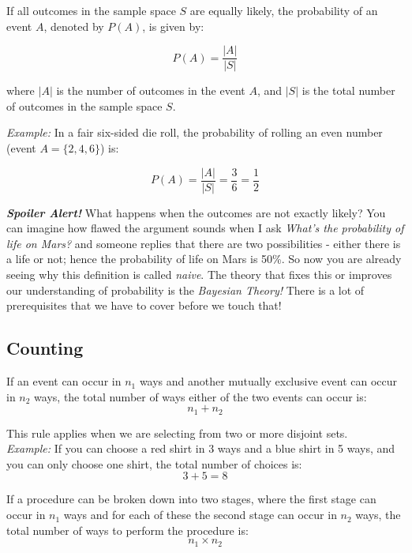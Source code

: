 \begin{definition}
    If all outcomes in the sample space \( S \) are equally likely, the probability of an event \( A \), denoted by \( P(A) \), is given by:

\[
P(A) = \frac{|A|}{|S|}
\]

where \( |A| \) is the number of outcomes in the event \( A \), and \( |S| \) is the total number of outcomes in the sample space \( S \).
\end{definition}

\textit{Example:} In a fair six-sided die roll, the probability of rolling an even number (event \( A = \{2, 4, 6\} \)) is:

\[
P(A) = \frac{|A|}{|S|} = \frac{3}{6} = \frac{1}{2}
\]

\textit{\textbf{Spoiler Alert!}} What happens when the outcomes are not exactly likely? You can imagine how flawed the argument sounds when I ask \textit{What's the probability of life on Mars?} and someone replies that there are two possibilities - either there is a life or not; hence the probability of life on Mars is 50\%. So now you are already seeing why this definition is called \textit{naive}. The theory that fixes this or improves our understanding of probability is the \textit{Bayesian Theory!} There is a lot of prerequisites that we have to cover before we touch that!

\subsection{Counting}

\begin{definition}
    If an event can occur in \( n_1 \) ways and another mutually exclusive event can occur in \( n_2 \) ways, the total number of ways either of the two events can occur is:
\[
n_1 + n_2
\]
\end{definition}

This rule applies when we are selecting from two or more disjoint sets. \\

\textit{Example:} If you can choose a red shirt in 3 ways and a blue shirt in 5 ways, and you can only choose one shirt, the total number of choices is:
\[
3 + 5 = 8
\]

\begin{definition}
    If a procedure can be broken down into two stages, where the first stage can occur in \( n_1 \) ways and for each of these the second stage can occur in \( n_2 \) ways, the total number of ways to perform the procedure is:
\[
n_1 \times n_2
\]
\end{definition}

